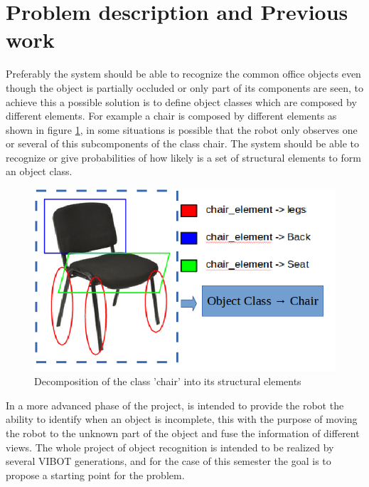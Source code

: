 \documentclass[fontsize=12pt]{article}
\begin{document}
\section{Problem description and Previous work} 
\label{sec:probdesc}
Preferably the system should be able to recognize the common office objects even though the object is partially occluded or only part of its components are seen, to achieve this a possible solution is to define object classes which are composed by different elements. For example a chair is composed by different elements as shown in figure \ref{fig:chair}, in some situations is possible that the robot only observes one or several of this subcomponents of the class chair. The system should be able to recognize or give probabilities of how likely is a set of structural elements to form an object class.
\begin{figure}[H]
\begin{center}
\includegraphics[width=0.5\linewidth]{images/chair}
\caption{Decomposition of the class 'chair' into its structural elements}
\label{fig:chair}
\end{center}
\end{figure}
In a more advanced phase of the project, is intended to provide the robot the ability to identify when an object is incomplete, this with the purpose of moving the robot to the unknown part of the object and fuse the information of different views. 
The whole project of object recognition is intended to be realized by several VIBOT generations, and for the case of this semester the goal is to propose a starting point for the problem. 
\end{document}
